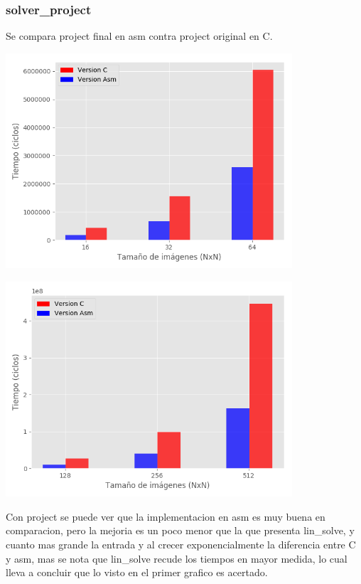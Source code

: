 \subsubsection{solver_project}
Se compara project final en asm contra project original en C.

\begin{center}
\includegraphics[width=0.8\textwidth]{imagenes/solver-project16-64.png}
\end{center}

\begin{center}
\includegraphics[width=0.8\textwidth]{imagenes/solver-project128-512.png}
\end{center}

Con project se puede ver que la implementacion en asm es muy buena en comparacion, pero la mejoria
es un poco menor que la que presenta lin_solve, y cuanto mas grande la entrada y al crecer exponencialmente
la diferencia entre C y asm,
mas se nota que lin_solve recude los tiempos en mayor medida, lo cual lleva a concluir
que lo visto en el primer grafico es acertado.





